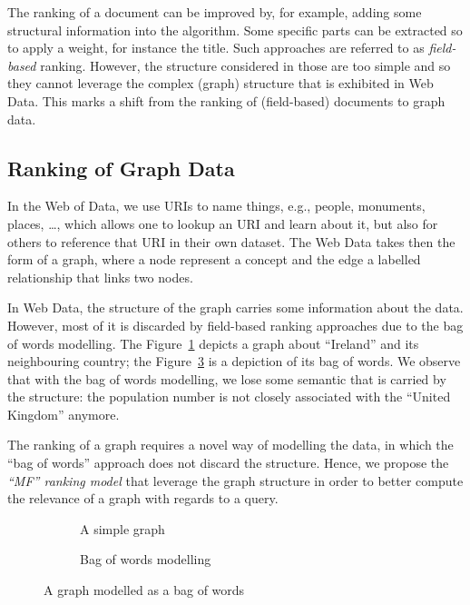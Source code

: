 The ranking of a document can be improved by, for example, adding some structural information into the algorithm. Some specific parts can be extracted so to apply a weight, for instance the title. Such approaches are referred to as \emph{field-based} ranking. However, the structure considered in those are too simple and so they cannot leverage the complex (graph) structure that is exhibited in Web Data. This marks a shift from the ranking of (field-based) documents to graph data.

\subsection{Ranking of Graph Data}

In the Web of Data, we use URIs to name things, e.g., people, monuments, places, \ldots, which allows one to lookup an URI and learn about it, but also for others to reference that URI in their own dataset. The Web Data takes then the form of a graph, where a node represent a concept and the edge a labelled relationship that links two nodes.

In Web Data, the structure of the graph carries some information about the data. However, most of it is discarded by field-based ranking approaches due to the bag of words modelling. The Figure~\ref{fig:bow-graph} depicts a  graph about ``Ireland'' and its neighbouring country; the Figure~\ref{fig:bow} is a depiction of its bag of words. We observe that with the bag of words modelling, we lose some semantic that is carried by the structure: the population number is not closely associated with the ``United Kingdom'' anymore.

The ranking of a graph requires a novel way of modelling the data, in which the ``bag of words'' approach does not discard the structure.
Hence, we propose the \emph{``MF'' ranking model} that leverage the graph structure in order to better compute the relevance of a graph with regards to a query.

\begin{figure}
	\centering
	\begin{subfigure}[b]{0.45\textwidth}
		\centering
		\resizebox{\textwidth}{!}{
			
		}
		\caption{A simple graph}
		\label{fig:bow-graph}
	\end{subfigure}
	\qquad
	\begin{subfigure}[b]{0.45\textwidth}
		\centering
		\resizebox{\textwidth}{!}{
			
		}
		\caption{Bag of words modelling}
		\label{fig:bow}
	\end{subfigure}
	\caption{A graph modelled as a bag of words}
\end{figure}


